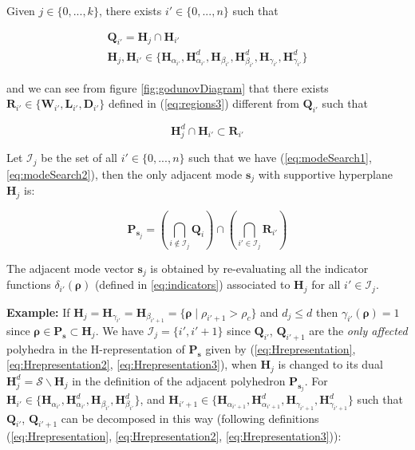 Given $j\in\{0,...,k\}$, there exists $i'\in\{0,...,n\}$ such that

\begin{equation}
\begin{array}{l}
\textbf{Q}_{i'}=\textbf{H}_{j}\cap \textbf{H}_{i'}\\
\textbf{H}_{j}, \textbf{H}_{i'}\in \{\textbf{H}_{\alpha_{i'}}, \textbf{H}^{d}_{\alpha_{i'}}, \textbf{H}_{\beta_{i'}}, \textbf{H}^{d}_{\beta_{i'}}, \textbf{H}_{\gamma_{i'}}, \textbf{H}^{d}_{\gamma_{i'}}\}
\end{array}
\label{eq:modeSearch1}
\end{equation}

\noindent and we can see from figure \ref{fig:godunovDiagram} that there exists $\textbf{R}_{i'} \in \{\textbf{W}_{i'}, \textbf{L}_{i'}, \textbf{D}_{i'}\}$ defined in (\ref{eq:regions3}) different from $\textbf{Q}_{i'}$ such that

\begin{equation}
\textbf{H}^{d}_{j}\cap \textbf{H}_{i'}\subset \textbf{R}_{i'}
\label{eq:modeSearch2}
\end{equation}

\noindent Let $\mathcal{I}_{j}$ be the set of all $i'\in\{0,...,n\}$ such that we have (\ref{eq:modeSearch1}, \ref{eq:modeSearch2}), then the only adjacent mode $\boldsymbol s_{j}$ with supportive hyperplane $\textbf{H}_{j}$ is: 

\begin{equation}
\textbf{P}_{\boldsymbol s_{j}}=(\bigcap_{i\notin \mathcal{I}_{j}} \textbf{Q}_{i})\cap (\bigcap_{i'\in\mathcal{I}_{j}}\textbf{R}_{i'})
\label{eq:modeSearch3}
\end{equation}

\noindent The adjacent mode vector $\boldsymbol s_{j}$ is obtained by re-evaluating all the indicator functions $\delta_{i'}(\boldsymbol\rho)$ (defined in \ref{eq:indicators}) associated to $\textbf{H}_{j}$ for all $i'\in\mathcal{I}_{j}$.

\hspace{10mm}

\noindent\textbf{Example: }If $\textbf{H}_{j}=\textbf{H}_{\gamma_{i'}}=\textbf{H}_{\beta_{i'+1}}=\{\boldsymbol\rho\mid\rho_{i'+1}>\rho_{c}\}$ and $d_{j}\leq d$ then $\gamma_{i'}(\boldsymbol \rho)=1$ since $\boldsymbol\rho\in\textbf{P}_{\boldsymbol s}\subset\textbf{H}_{j}$. We have $\mathcal{I}_{j}=\{i',i'+1\}$ since $\textbf{Q}_{i'}$, $\textbf{Q}_{i'+1}$ are the \textit{only affected} polyhedra in the H-representation of $\textbf{P}_{\boldsymbol s}$ given by (\ref{eq:Hrepresentation}, \ref{eq:Hrepresentation2}, \ref{eq:Hrepresentation3}), when $\textbf{H}_{j}$ is changed to its dual $\textbf{H}^{d}_{j}=\mathcal{S}\backslash \textbf{H}_{j}$ in the definition of the adjacent polyhedron $\textbf{P}_{\boldsymbol s_{j}}$. For $\textbf{H}_{i'}\in\{\textbf{H}_{\alpha_{i'}}, \textbf{H}^{d}_{\alpha_{i'}}, \textbf{H}_{\beta_{i'}}, \textbf{H}^{d}_{\beta_{i'}}\}$, and $\textbf{H}_{i'+1}\in\{\textbf{H}_{\alpha_{i'+1}}, \textbf{H}^{d}_{\alpha_{i'+1}}, \textbf{H}_{\gamma_{i'+1}}, \textbf{H}^{d}_{\gamma_{i'+1}}\}$ such that $\textbf{Q}_{i'}$, $\textbf{Q}_{i'+1}$ can be decomposed in this way (following definitions (\ref{eq:Hrepresentation}, \ref{eq:Hrepresentation2}, \ref{eq:Hrepresentation3})):

